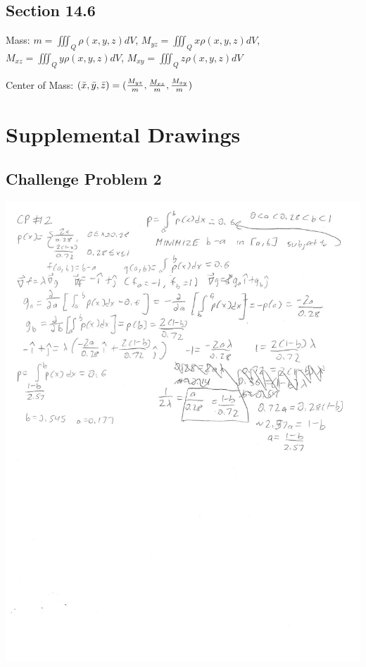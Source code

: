 \documentclass{article}
\begin{document}
\subsection{Section 14.6}
\par\noindent\Large Mass: $m = \iiint_{Q}\rho(x, y, z)dV$, $M_{yz} = \iiint_{Q}x\rho(x, y, z)dV$, $M_{xz} = \iiint_{Q}y\rho(x, y, z)dV$, $M_{xy} = \iiint_{Q}z\rho(x, y, z)dV$
\par\noindent\Large Center of Mass: $(\Bar{x}, \Bar{y}, \Bar{z}) = (\frac{M_{yz}}{m}, \frac{M_{xz}}{m}, \frac{M_{xy}}{m})$

\section{Supplemental Drawings}

\subsection{Challenge Problem 2}

\includegraphics[]{ch 13 cp 22018-11-04-141446-1.jpg}\centering

\raggedright
\end{document}
